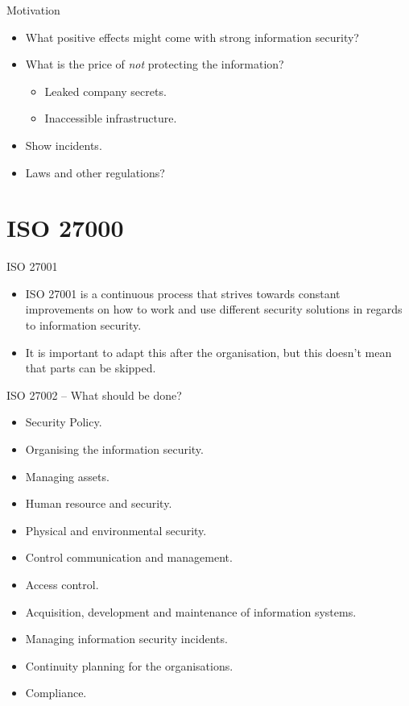 \documentclass{beamer}
\begin{document}
\begin{frame}{Motivation}
  \begin{itemize}
    \item What positive effects might come with strong information security?
    \item What is the price of \emph{not} protecting the information?
      \begin{itemize}
        \item Leaked company secrets.
        \item Inaccessible infrastructure.
      \end{itemize}
    \item Show incidents.
    \item Laws and other regulations?
  \end{itemize}
\end{frame}

\section{ISO 27000}
\begin{frame}{ISO 27001}
  \begin{itemize}
    \item ISO 27001 is a continuous process that strives towards constant
      improvements on how to work and use different security solutions in
      regards to information security.
    \item It is important to adapt this after the organisation, but this doesn't
      mean that parts can be skipped.
  \end{itemize}
\end{frame}

\begin{frame}{ISO 27002 -- What should be done?}
  \begin{itemize}
    \item Security Policy.
    \item Organising the information security.
    \item Managing assets.
    \item Human resource and security.
    \item Physical and environmental security.
    \item Control communication and management.
    \item Access control.
    \item Acquisition, development and maintenance of information systems.
    \item Managing information security incidents.
    \item Continuity planning for the organisations.
    \item Compliance.
  \end{itemize}
\end{frame}
\end{document}
